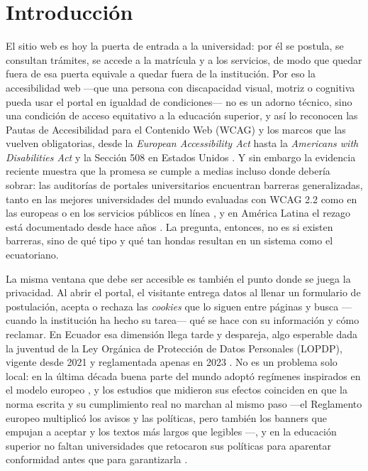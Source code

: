 \documentclass[pdflatex,sn-basic,Numbered]{sn-jnl}
\theoremstyle{thmstyleone}
\theoremstyle{thmstyletwo}
\theoremstyle{thmstylethree}
\begin{document}
\maketitle

\section{Introducci\'on}
El sitio web es hoy la puerta de entrada a la universidad: por él se postula, se consultan trámites, se accede a la matrícula y a los servicios, de modo que quedar fuera de esa puerta equivale a quedar fuera de la institución. Por eso la accesibilidad web ---que una persona con discapacidad visual, motriz o cognitiva pueda usar el portal en igualdad de condiciones--- no es un adorno técnico, sino una condición de acceso equitativo a la educación superior, y así lo reconocen las Pautas de Accesibilidad para el Contenido Web (WCAG) \citep{wcag21} y los marcos que las vuelven obligatorias, desde la \emph{European Accessibility Act} \citep{eaa2019} hasta la \emph{Americans with Disabilities Act} y la Sección 508 en Estados Unidos \citep{ada1990,section508}. Y sin embargo la evidencia reciente muestra que la promesa se cumple a medias incluso donde debería sobrar: las auditorías de portales universitarios encuentran barreras generalizadas, tanto en las mejores universidades del mundo evaluadas con WCAG 2.2 \citep{krittika2025accessibility} como en las europeas \citep{krejtz2025higher} o en los servicios públicos en línea \citep{aljedaani2025egovernment}, y en América Latina el rezago está documentado desde hace años \citep{campoverdemolina2023accessibility,acostavargas2020dataset}. La pregunta, entonces, no es si existen barreras, sino de qué tipo y qué tan hondas resultan en un sistema como el ecuatoriano.

La misma ventana que debe ser accesible es también el punto donde se juega la privacidad. Al abrir el portal, el visitante entrega datos al llenar un formulario de postulación, acepta o rechaza las \emph{cookies} que lo siguen entre páginas y busca ---cuando la institución ha hecho su tarea--- qué se hace con su información y cómo reclamar. En Ecuador esa dimensión llega tarde y despareja, algo esperable dada la juventud de la Ley Orgánica de Protección de Datos Personales (LOPDP), vigente desde 2021 y reglamentada apenas en 2023 \citep{lopdp2021,reglamentolopdp2023}. No es un problema solo local: en la última década buena parte del mundo adoptó regímenes inspirados en el modelo europeo \citep{gdpr2016}, y los estudios que midieron sus efectos coinciden en que la norma escrita y su cumplimiento real no marchan al mismo paso ---el Reglamento europeo multiplicó los avisos y las políticas, pero también los banners que empujan a aceptar y los textos más largos que legibles \citep{degeling2019value,kretschmer2021cookie}---, y en la educación superior no faltan universidades que retocaron sus políticas para aparentar conformidad antes que para garantizarla \citep{munot2025compliance}.
\end{document}
